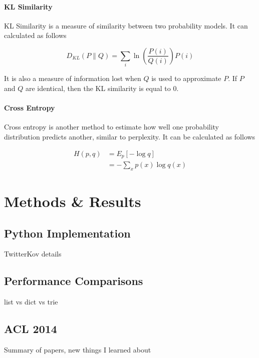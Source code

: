 \documentclass[11pt]{article}
\begin{document}
\paragraph{KL Similarity}

KL Similarity is a measure of similarity between two probability models. It can calculated as follows

$$D_{KL}\left(P\|Q\right) = \sum\limits_i \ln\left(\frac{P\left(i\right)}{Q\left(i\right)}\right) P\left(i\right)$$

It is also a measure of information lost when $Q$ is used to approximate $P$. If $P$ and $Q$ are identical, then the KL similarity is equal to 0.

\paragraph{Cross Entropy}

Cross entropy is another method to estimate how well one probability distribution predicts another, similar to perplexity. It can be calculated as follows

\begin{align*}
H\left(p,q\right) &= E_p\left[-\log q\right] \\
&= -\sum_x p\left(x\right) \log q\left(x\right)
\end{align*}

\section{Methods \& Results}

\subsection{Python Implementation}

{\color{red} TwitterKov details}

\subsection{Performance Comparisons}

{\color{red} list vs dict vs trie}

\subsection{ACL 2014}

{\color{red} Summary of papers, new things I learned about}
\end{document}
